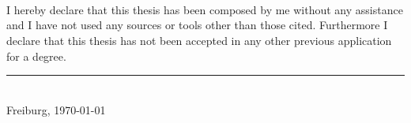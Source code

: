\\\\\\
I hereby declare that this thesis has been composed by me without any assistance and I have not used any sources or tools other than those cited. 
Furthermore I declare that this thesis has not been accepted in any other previous application for a degree.

\vfill
\rule{5cm}{.5pt}\\
\phantom{ab}Freiburg, \today